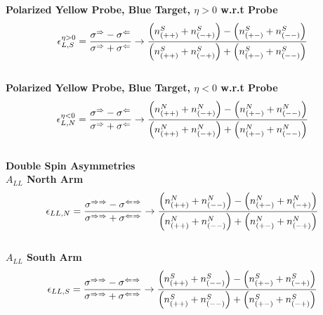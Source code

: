 \noindent\textbf{Polarized Yellow Probe, Blue Target, $\eta > 0$ w.r.t Probe}
\begin{equation}
  {\epsilon_{L,S}^{\eta > 0}} 
  = 
  { 
    {\sigma^\Rightarrow-\sigma^\Leftarrow} 
    \over 
    {\sigma^\Rightarrow+\sigma^\Leftarrow} 
  } 
  \to 
  {
    {\left(n_{(++)}^S+n_{(-+)}^S\right)-\left(n_{(+-)}^S+n_{(--)}^S\right)}
    \over
    {\left(n_{(++)}^S+n_{(-+)}^S\right)+\left(n_{(+-)}^S+n_{(--)}^S\right)}
  }
  \label{eq:al_yell_probe_pos_rap}
\end{equation}\\

\noindent\textbf{Polarized Yellow Probe, Blue Target, $\eta < 0$ w.r.t Probe}
\begin{equation}
  {\epsilon_{L,N}^{\eta < 0}} 
  = 
  { 
    {\sigma^\Rightarrow-\sigma^\Leftarrow} 
    \over 
    {\sigma^\Rightarrow+\sigma^\Leftarrow} 
  } 
  \to 
  {
    {\left(n_{(++)}^N+n_{(-+)}^N\right)-\left(n_{(+-)}^N+n_{(--)}^N\right)}
    \over
    {\left(n_{(++)}^N+n_{(-+)}^N\right)+\left(n_{(+-)}^N+n_{(--)}^N\right)}
  }
  \label{eq:al_yell_probe_neg_rap}
\end{equation}\\

\noindent\textbf{Double Spin Asymmetries} \\

\noindent\textbf{$A_{LL}$ North Arm}
\begin{equation}
  {\epsilon_{LL,N}}
  = 
  { 
    {\sigma^{\Rightarrow\Rightarrow}-\sigma^{\Leftarrow\Rightarrow}} 
    \over 
    {\sigma^{\Rightarrow\Rightarrow}+\sigma^{\Leftarrow\Rightarrow}} 
  } 
  \to 
  {
    {\left(n_{(++)}^N+n_{(--)}^N\right)-\left(n_{(+-)}^N+n_{(-+)}^N\right)}
    \over
    {\left(n_{(++)}^N+n_{(--)}^N\right)+\left(n_{(+-)}^N+n_{(-+)}^N\right)}
  }
  \label{eq:all_north}
\end{equation}\\

\noindent\textbf{$A_{LL}$ South Arm}
\begin{equation}
  {\epsilon_{LL,S}}
  = 
  { 
    {\sigma^{\Rightarrow\Rightarrow}-\sigma^{\Leftarrow\Rightarrow}} 
    \over 
    {\sigma^{\Rightarrow\Rightarrow}+\sigma^{\Leftarrow\Rightarrow}} 
  } 
  \to 
  {
    {\left(n_{(++)}^S+n_{(--)}^S\right)-\left(n_{(+-)}^S+n_{(-+)}^S\right)}
    \over
    {\left(n_{(++)}^S+n_{(--)}^S\right)+\left(n_{(+-)}^S+n_{(-+)}^S\right)}
  }
  \label{eq:all_south}
\end{equation}\\


